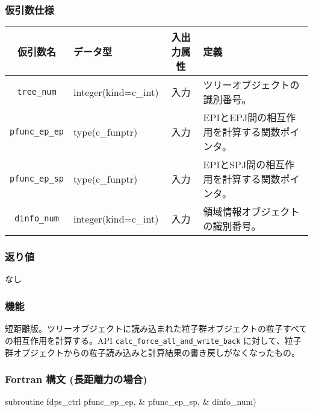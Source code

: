\subsubsection*{仮引数仕様}
\begin{table}[h]
\begin{tabularx}{\linewidth}{cXcX}
\toprule
\rowcolor{Snow2}
仮引数名 & データ型 & 入出力属性 & 定義 \\
\midrule
\verb|tree_num|    & integer(kind=c\_int)   & 入力     & ツリーオブジェクトの識別番号。\\
\verb|pfunc_ep_ep| & type(c\_funptr)        & 入力     & EPIとEPJ間の相互作用を計算する関数ポインタ。\\
\verb|pfunc_ep_sp| & type(c\_funptr)        & 入力     & EPIとSPJ間の相互作用を計算する関数ポインタ。\\
\verb|dinfo_num|   & integer(kind=c\_int)   & 入力     & 領域情報オブジェクトの識別番号。\\
\bottomrule
\end{tabularx}
\end{table}

\subsubsection*{返り値}
なし

\subsubsection*{機能}
短距離版。ツリーオブジェクトに読み込まれた粒子群オブジェクトの粒子すべての相互作用を計算する。API \texttt{calc\_force\_all\_and\_write\_back} に対して、粒子群オブジェクトからの粒子読み込みと計算結果の書き戻しがなくなったもの。
\clearpage

\subsubsection*{Fortran 構文 (長距離力の場合)}
\begin{screen}
\begin{spverbatim}
subroutine fdps_ctrl%
                                            pfunc_ep_ep, &
                                            pfunc_ep_sp, &
                                            dinfo_num)
\end{spverbatim}
\end{screen}

